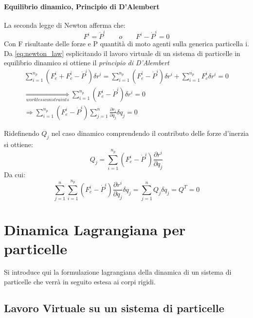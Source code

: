 \paragraph{Equilibrio dinamico, Principio di D'Alembert}
La seconda legge di Newton afferma che: \begin{equation}
\label{eq:newton_law}
F^i = \dot{P}^i \qquad o \qquad F^i - \dot{P}^i = 0
\end{equation}
Con F risultante delle forze e P quantità di moto agenti sulla generica particella i. 
Da \ref{eq:newton_law} esplicitando il lavoro virtuale di un sistema di particelle in equilibrio dinamico si 
ottiene il \emph{principio di D'Alembert}
\begin{gather} 
\label{eq:dalembert_principle}
\sum_{i=1}^{n_p} (F_e^i + F_c^i -\dot{P}^i )\delta r^i = \sum_{i=1}^{n_p} (F_e^i -\dot{P}^i )\delta r^i + \sum_{i=1}^{n_p} F_c^i\delta r^i = 0 \nonumber \\ \underset{workless constraints}{\Rightarrow} \sum_{i=1}^{n_p} (F_e^i -\dot{P}^i )\delta r^i = 0 \nonumber \\ \Rightarrow \sum_{i=1}^{n_p} (F_e^i -\dot{P}^i )\sum_{j=1}^n \frac{\partial r_i}{\partial q_j} \delta q_j = 0
\end{gather}

Ridefinendo $Q_j$ nel caso dinamico comprendendo il contributo delle forze d'inerzia si ottiene:
\begin{equation}
Q_j = \sum_{i=1}^{n_p} \left(F_e^i-\dot{P}^i\right)\frac{\partial r^i}{\partial q_j}
\end{equation}
Da cui:
\begin{equation}
\sum_{j=1}^n \sum_{i=1}^{n_p} \left(F_e^i-\dot{P}^i\right)\frac{\partial r^i}{\partial q_j}\delta q_j = \sum_{j=1}^n Q_j \delta q_j = Q^T = 0
\end{equation}
\section{Dinamica Lagrangiana per particelle}
Si introduce qui la formulazione lagrangiana della dinamica di un sistema di particelle che verrà in seguito estesa
ai corpi rigidi.
\subsection{Lavoro Virtuale su un sistema di particelle}
